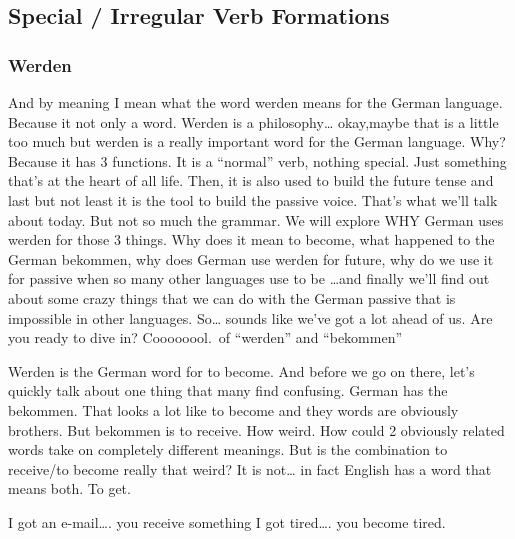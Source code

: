 \documentclass[a4paper,12pt]{article}
\begin{document}
\subsection{\bf{Special / Irregular Verb Formations}}
\begin{adjustwidth}{2em}{0pt}
\label{sec:special_irregular_verb_formations}





\subsubsection{Werden}
\begin{adjustwidth}{3em}{0pt}
\label{sec:werden}

And by meaning I mean what the word werden means for the German language.
Because it not only a word. Werden is a philosophy… okay,maybe that is a little
too much but werden is a really important word for the German language. Why?
Because it has 3 functions.  It is a “normal” verb, nothing special. Just
something that’s at the heart of all life. Then, it is also used to build the
future tense and last but not least it is the tool to build the passive voice.
That’s what we’ll talk about today. But not so much the grammar. We will explore
WHY German uses werden for those 3 things. Why does it mean to become, what
happened to the German bekommen, why does German use werden for future, why do
we use it for passive when so many other languages use to be \ldots and finally
we’ll find out about some crazy things that we can do with the German passive
that is impossible in other languages.  So… sounds like we’ve got a lot ahead of
us. Are you ready to dive in? Coooooool.\  of “werden” and “bekommen”

Werden is the German word for to become. And before we go on there, let’s quickly talk about one thing that many find confusing. German has the bekommen. That  looks a lot like to become and they words are obviously brothers. But bekommen is to receive. How weird. How could 2 obviously related words take on completely different meanings. But is the combination to receive/to become really that weird? It is not… in fact English has a word that means both. To get.

    I got an e-mail…. you receive something
    I got tired…. you become tired.


\end{adjustwidth}
\end{adjustwidth}
\end{document}
